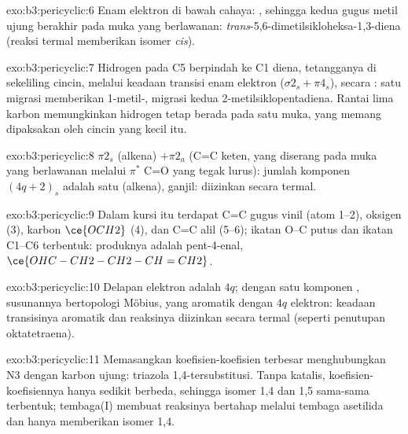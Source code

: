 \begin{solution}{exo:b3:pericyclic:6}
Enam elektron di bawah cahaya: , sehingga kedua gugus metil ujung berakhir pada
muka yang berlawanan: \textit{trans}-5,6-dimetilsikloheksa-1,3-diena (reaksi termal memberikan
isomer \textit{cis}).
\end{solution}

\begin{solution}{exo:b3:pericyclic:7}
Hidrogen pada C5 berpindah ke C1 diena, tetangganya di sekeliling cincin,
melalui keadaan transisi enam elektron ($\sigma2_s + \pi4_s$), secara : satu migrasi
memberikan 1-metil-, migrasi kedua 2-metilsiklopentadiena. Rantai lima karbon memungkinkan
hidrogen tetap berada pada satu muka, yang memang dipaksakan oleh cincin yang kecil itu.
\end{solution}

\begin{solution}{exo:b3:pericyclic:8}
$\pi2_s$ (alkena) $+ \pi2_a$ (C=C keten, yang diserang pada muka yang berlawanan melalui
$\pi^*$ C=O yang tegak lurus): jumlah komponen $(4q + 2)_s$ adalah satu (alkena), ganjil:
diizinkan secara termal.
\end{solution}

\begin{solution}{exo:b3:pericyclic:9}
Dalam kursi itu terdapat C=C gugus vinil (atom 1--2), oksigen (3), karbon
$\ce{OCH2}$ (4), dan C=C alil (5--6); ikatan O--C putus dan ikatan C1--C6 terbentuk:
produknya adalah pent-4-enal,
$\ce{OHC-CH2-CH2-CH=CH2}$.
\end{solution}

\begin{solution}{exo:b3:pericyclic:10}
Delapan elektron adalah $4q$; dengan satu komponen , susunannya bertopologi
Möbius, yang aromatik dengan $4q$ elektron: keadaan transisinya aromatik dan
reaksinya diizinkan secara termal (seperti penutupan  oktatetraena).
\end{solution}

\begin{solution}{exo:b3:pericyclic:11}
Memasangkan koefisien-koefisien terbesar menghubungkan N3 dengan karbon ujung: triazola
1,4-tersubstitusi. Tanpa katalis, koefisien-koefisiennya hanya sedikit berbeda, sehingga
isomer 1,4 dan 1,5 sama-sama terbentuk; tembaga(I) membuat reaksinya bertahap melalui
tembaga asetilida dan hanya memberikan isomer 1,4.
\end{solution}

